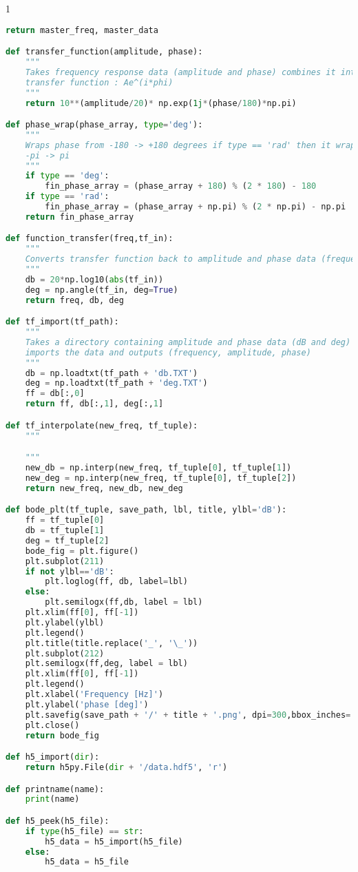 \begin{spacing}{1}
\begin{lstlisting}[frame=single, language=Python]
    return master_freq, master_data

def transfer_function(amplitude, phase):
    """
    Takes frequency response data (amplitude and phase) combines it into a
    transfer function : Ae^(i*phi)
    """
    return 10**(amplitude/20)* np.exp(1j*(phase/180)*np.pi)

def phase_wrap(phase_array, type='deg'):
    """
    Wraps phase from -180 -> +180 degrees if type == 'rad' then it wraps from
    -pi -> pi
    """
    if type == 'deg':
        fin_phase_array = (phase_array + 180) % (2 * 180) - 180
    if type == 'rad':
        fin_phase_array = (phase_array + np.pi) % (2 * np.pi) - np.pi
    return fin_phase_array

def function_transfer(freq,tf_in):
    """
    Converts transfer function back to amplitude and phase data (frequency, amplitude [dB], phase [deg])
    """
    db = 20*np.log10(abs(tf_in))
    deg = np.angle(tf_in, deg=True)
    return freq, db, deg

def tf_import(tf_path):
    """
    Takes a directory containing amplitude and phase data (dB and deg) and
    imports the data and outputs (frequency, amplitude, phase)
    """
    db = np.loadtxt(tf_path + 'db.TXT')
    deg = np.loadtxt(tf_path + 'deg.TXT')
    ff = db[:,0]
    return ff, db[:,1], deg[:,1]

def tf_interpolate(new_freq, tf_tuple):
    """

    """
    new_db = np.interp(new_freq, tf_tuple[0], tf_tuple[1])
    new_deg = np.interp(new_freq, tf_tuple[0], tf_tuple[2])
    return new_freq, new_db, new_deg

def bode_plt(tf_tuple, save_path, lbl, title, ylbl='dB'):
    ff = tf_tuple[0]
    db = tf_tuple[1]
    deg = tf_tuple[2]
    bode_fig = plt.figure()
    plt.subplot(211)
    if not ylbl=='dB':
        plt.loglog(ff, db, label=lbl)
    else:
        plt.semilogx(ff,db, label = lbl)
    plt.xlim(ff[0], ff[-1])
    plt.ylabel(ylbl)
    plt.legend()
    plt.title(title.replace('_', '\_'))
    plt.subplot(212)
    plt.semilogx(ff,deg, label = lbl)
    plt.xlim(ff[0], ff[-1])
    plt.legend()
    plt.xlabel('Frequency [Hz]')
    plt.ylabel('phase [deg]')
    plt.savefig(save_path + '/' + title + '.png', dpi=300,bbox_inches='tight')
    plt.close()
    return bode_fig

def h5_import(dir):
    return h5py.File(dir + '/data.hdf5', 'r')

def printname(name):
    print(name)

def h5_peek(h5_file):
    if type(h5_file) == str:
        h5_data = h5_import(h5_file)
    else:
        h5_data = h5_file


\end{lstlisting}
\end{spacing}
